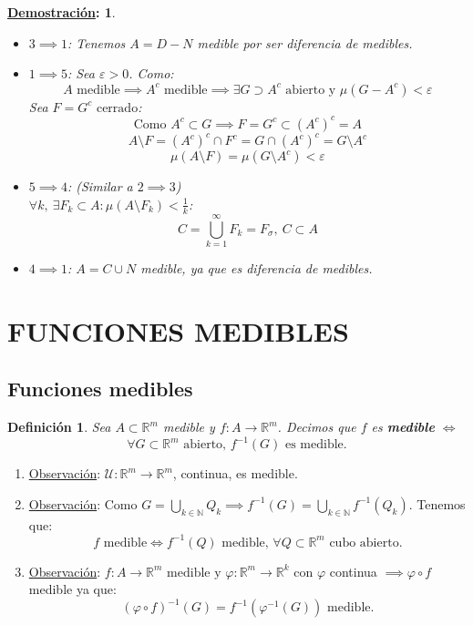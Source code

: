 \documentclass[10pt,a4paper,openright]{book}
\theoremstyle{break}
\newtheorem*{defi}{Definición}
\newtheorem*{demo}{\underline{Demostración}:}
\begin{document}
\begin{demo}
\begin{itemize}
\item $3 \implies 1$: Tenemos $A = D - N$ medible por ser diferencia de medibles.

\item $1 \implies 5$: Sea $\varepsilon > 0$. Como:
    $$A \text{ medible} \implies A^c \text{ medible} \implies \exists G \supset A^c \text{ abierto y } \mu\left( G - A^c \right) < \varepsilon$$ 
Sea $F = G^c \text{ cerrado}$:
$$\text{Como } A^c \subset G \implies F = G^c \subset \left( A^c \right)^c = A$$
$$A \setminus F = \left( A^c \right)^c \cap F^c = G \cap \left( A^c \right)^c = G \setminus A^c$$
$$\mu\left( A \setminus F \right) = \mu\left( G \setminus A^c \right) < \varepsilon$$

\item $5 \implies 4$: (Similar a $2 \implies 3$)\\
$\forall k,\ \exists F_k \subset A : \mu\left( A \setminus F_k \right) < \frac{1}{k}$:
$$C = \bigcup_{k = 1}^{\infty}F_k = F_{\sigma},\ C \subset A$$ 

\item $4 \implies 1$: $A = C \cup N$ medible, ya que es diferencia de medibles.
\end{itemize}
\end{demo}

\chapter*{FUNCIONES MEDIBLES}%
\label{cha:funciones_medibles}
\section*{Funciones medibles}%
\label{sec:funciones_medibles}


\begin{defi}
Sea $A \subset \mathbb{R}^m$ medible y $f: A \to \mathbb{R}^m$. Decimos que $f$ es \textbf{medible} $\iff$
$$\forall G \subset \mathbb{R}^m \text{ abierto, } f^{-1}(G) \text{ es medible}.$$ 
\end{defi}

\begin{enumerate}
\item \underline{Observación}:
$\mathcal{U}: \mathbb{R}^m \to \mathbb{R}^m$, continua, es medible.
    \item \underline{Observación}:
Como $G = \bigcup_{k \in \mathbb{N}} Q_k\implies f^{-1}\left( G \right) = \bigcup_{k \in \mathbb{N}}f^{-1}\left( Q_k \right)$. Tenemos que:
$$f \text{ medible} \iff f^{-1}\left( Q \right) \text{ medible, } \forall Q \subset \mathbb{R}^m \text{ cubo abierto.}$$
\item \underline{Observación}:
$f: A \to \mathbb{R}^m \text{ medible y }\varphi: \mathbb{R}^m \to \mathbb{R}^k$ con $\varphi$ continua $\implies \varphi \circ f$ medible ya que:
$$\left( \varphi \circ f \right)^{-1} \left( G \right) = f^{-1}\left( \varphi^{-1}\left( G \right) \right) \text{ medible.}$$
\end{enumerate}
\end{document}

